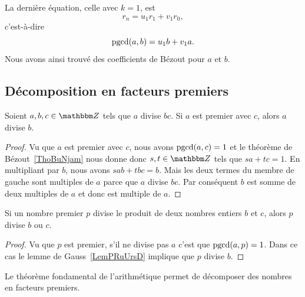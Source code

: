 La dernière équation, celle avec \( k=1\), est
\begin{equation}
    r_n=u_1r_1+v_1r_0,
\end{equation}
c'est-à-dire
\begin{equation}        \label{EqNDMLooDvaiAc}
    \operatorname{pgcd}(a,b)=u_1b+v_1a.
\end{equation}
Nous avons ainsi trouvé des coefficients de Bézout pour $a$ et $b$.


\subsection{Décomposition en facteurs premiers}

\begin{lemma}    \label{LemPRuUrsD}
    Soient \( a,b,c\in \eZ\) tels que \( a\) divise \( bc\). Si \( a\) est premier avec \( c\), alors \( a\) divise \( b\).
\end{lemma}

\begin{proof}
    Vu que \( a\) est premier avec \( c\), nous avons \( \operatorname{pgcd}(a,c)=1\) et le théorème de Bézout~\ref{ThoBuNjam} nous donne donc \( s,t\in \eZ\) tels que \( sa+tc=1\). En multipliant par \( b\), nous avons $sab+tbc=b$. Mais les deux termes du membre de gauche sont multiples de \( a\) parce que \( a\) divise \( bc\). Par conséquent \( b\) est somme de deux multiples de \( a\) et donc est multiple de \( a\).
\end{proof}

\begin{lemma}       \label{LemAXINooOeuMJZ}
    Si un nombre premier $p$ divise le produit de deux nombres entiers $b$ et $c$, alors $p$ divise $b$ ou $c$.
\end{lemma}

\begin{proof}
    Vu que \( p\) est premier, s'il ne divise pas \( a\) c'est que \( \operatorname{pgcd}(a,p)=1\). Dans ce cas le lemme de Gauss~\ref{LemPRuUrsD} implique que \( p\) divise \( b\).
\end{proof}

Le théorème fondamental de l'arithmétique permet de décomposer des nombres en facteurs premiers.

